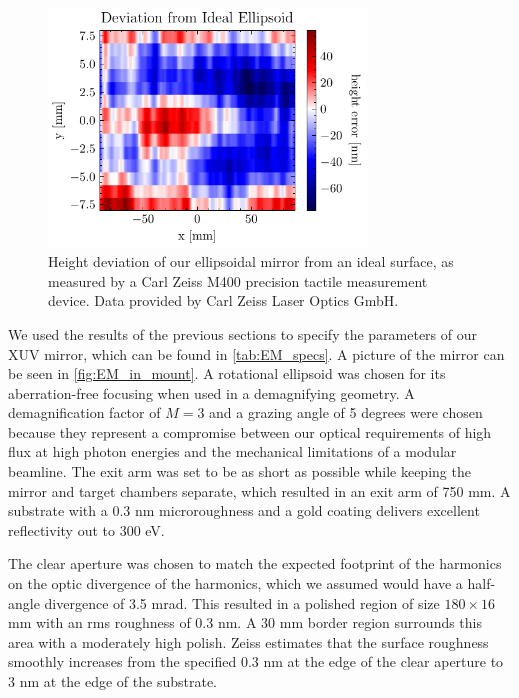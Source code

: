 \begin{figure}
	\centering
	\includegraphics[width=0.75\textwidth]{figures/chap2/EM_error.pdf}
	\caption{Height deviation of our ellipsoidal mirror from an ideal surface, as measured by a Carl Zeiss M400 precision tactile measurement device. Data provided by Carl Zeiss Laser Optics GmbH.}
	\label{fig:EM_error}
\end{figure}

We used the results of the previous sections to specify the parameters of our XUV mirror, which can be found in \cref{tab:EM_specs}. A picture of the mirror can be seen in \cref{fig:EM_in_mount}. A rotational ellipsoid was chosen for its aberration-free focusing when used in a demagnifying geometry. A demagnification factor of $M = 3$ and a grazing angle of 5 degrees were chosen because they represent a compromise between our optical requirements of high flux at high photon energies and the mechanical limitations of a modular beamline. The exit arm was set to be as short as possible while keeping the mirror and target chambers separate, which resulted in an exit arm of 750 mm. A substrate with a 0.3 nm microroughness and a gold coating delivers excellent reflectivity out to 300 eV.

The clear aperture was chosen to match the expected footprint of the harmonics on the optic divergence of the harmonics, which we assumed would have a half-angle divergence of 3.5 mrad. This resulted in a polished region of size $180 \times 16$ mm with an rms roughness of 0.3 nm. A 30 mm border region surrounds this area with a moderately high polish. Zeiss estimates that the surface roughness smoothly increases from the specified 0.3 nm at the edge of the clear aperture to 3 nm at the edge of the substrate.


